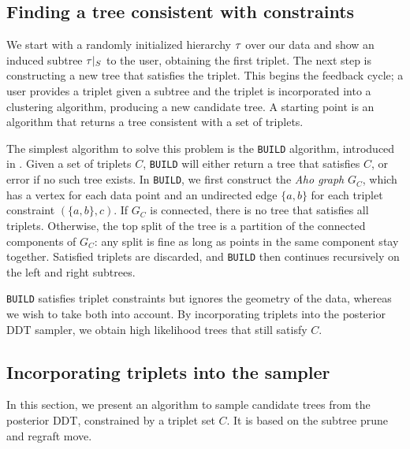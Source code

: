 \subsection{Finding a tree consistent with constraints}
\label{sec:aho}
We start with a randomly initialized hierarchy $\tau$
over our data
and show an induced subtree $\tau|_S$ to the user, obtaining the
first triplet. The next step is constructing  
a new tree that satisfies the triplet.
This begins the feedback cycle; a user provides a triplet
given a subtree and the triplet is incorporated into a clustering algorithm,
producing a new candidate tree.
A starting point is 
an algorithm that returns 
a tree consistent with a set of triplets.

The simplest algorithm to solve this problem is
the \texttt{BUILD} algorithm, introduced in \citet{ASSU81}.
Given a set of triplets $C$, \texttt{BUILD}
will either return a tree that satisfies $C$, or error 
if no such tree exists.
In \texttt{BUILD}, we first construct the {\it Aho graph}
$G_C$, which has a vertex for each data point and an 
undirected edge $\{a,b\}$ for each triplet constraint $(\{a,b\},c)$.
If $G_C$ is connected, there is no tree that satisfies all
triplets. Otherwise, the top split of the tree is a partition of 
the connected components of $G_C$: any split is fine as long as 
points in the same component stay together. Satisfied triplets are discarded, and \texttt{BUILD} then continues recursively on the
left and right subtrees.

\texttt{BUILD} satisfies triplet constraints but ignores 
the geometry of the data, whereas we wish to take both into
account. By incorporating triplets into the posterior DDT 
sampler, we obtain high likelihood trees that still satisfy $C$.


\subsection{Incorporating triplets into the sampler}

In this section, we present an algorithm
to sample candidate trees 
from the posterior DDT, constrained
by a triplet set $C$.
It is based on the subtree prune and regraft move.

